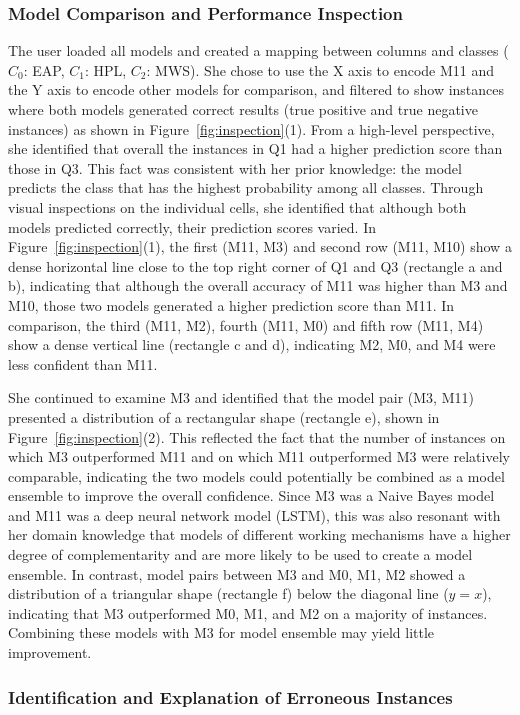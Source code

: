 \documentclass[preprint,journal]{vgtc}       %
\begin{document}
\subsubsection{Model Comparison and Performance Inspection}
The user loaded all models and created a mapping between columns and classes ($C_0$: EAP, $C_1$: HPL, $C_2$: MWS). She chose to use the X axis to encode M11 and the Y axis to encode other models for comparison, and filtered to show instances where both models generated correct results (true positive and true negative instances) as shown in Figure~\ref{fig:inspection}(1). From a high-level perspective, she identified that overall the instances in Q1 had a higher prediction score than those in Q3. This fact was consistent with her prior knowledge: the model predicts the class that has the highest probability among all classes. Through visual inspections on the individual cells, she identified that although both models predicted correctly, their prediction scores varied. In Figure~\ref{fig:inspection}(1), the first (M11, M3) and second row (M11, M10) show a dense horizontal line close to the top right corner of Q1 and Q3 (rectangle a and b), indicating that although the overall accuracy of M11 was higher than M3 and M10, those two models generated a higher prediction score than M11. In comparison, the third (M11, M2), fourth (M11, M0) and fifth row (M11, M4) show a dense vertical line (rectangle c and d), indicating M2, M0, and M4 were less confident than M11.

She continued to examine M3 and identified that the model pair (M3, M11) presented a distribution of a rectangular shape (rectangle e), shown in Figure~\ref{fig:inspection}(2). This reflected the fact that the number of instances on which M3 outperformed M11 and on which M11 outperformed M3 were relatively comparable, indicating the two models could potentially be combined as a model ensemble to improve the overall confidence. Since M3 was a Naive Bayes model and M11 was a deep neural network model (LSTM), this was also resonant with her domain knowledge that models of different working mechanisms have a higher degree of complementarity and are more likely to be used to create a model ensemble. In contrast, model pairs between M3 and M0, M1, M2 showed a distribution of a triangular shape (rectangle f) below the diagonal line ($y = x$), indicating that M3 outperformed M0, M1, and M2 on a majority of instances. Combining these models with M3 for model ensemble may yield little improvement.

\subsubsection{Identification and Explanation of Erroneous Instances}
\end{document}
